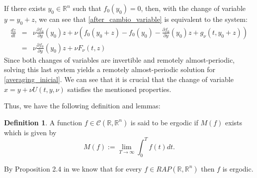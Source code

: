 \documentclass[english,reqno]{amsart}
\numberwithin{equation}{section}
\theoremstyle{plain}
\theoremstyle{definition}
\newtheorem{defn}{Definition}[section]
\theoremstyle{remark}
\begin{document}
If there exists $y_0\in\mathbb{R}^n$ such that $f_0(y_0)=0$, then, with the change of variable $y=y_0+z$, we can see that \eqref{after_cambio_variable} is equivalent to the system:
\begin{eqnarray*}
\frac{dz}{dt}
&=&\nu \frac{\partial f_0}{\partial y}(y_0)z+ \nu \left( f_{0}(y_0+z)-f_0(y_0)-\frac{\partial f_{0}}{\partial y}(y_0) z +g_{\nu}(t,y_0+z)\right)\\
&=& \nu \frac{\partial f_0}{\partial y}(y_0)z+ \nu F_{\nu}(t,z)
\end{eqnarray*}
Since both changes of variables are invertible and remotely almost-periodic, solving this last system yields a remotely almost-periodic solution for \eqref{averaging_inicial}.  
We can see that it is crucial that the change of variable $x=y+\nu U(t,y,\nu)$ satisfies the mentioned properties.  

Thus, we have the following definition and lemmas:


\begin{defn}
A function $f\in \mathcal{C}(\mathbb{R},\mathbb{R}^n)$ is said to be ergodic if $M(f)$ exists which is given by
\[
M(f):=\lim_{T\rightarrow\infty}\int_{0}^{T}f(t)dt.
\]
\end{defn}
By Proposition 2.4 in \cite{devanei} we know that for every $f\in RAP(\mathbb{R},\mathbb{R}^n)$ then $f$ is ergodic.
\end{document}
